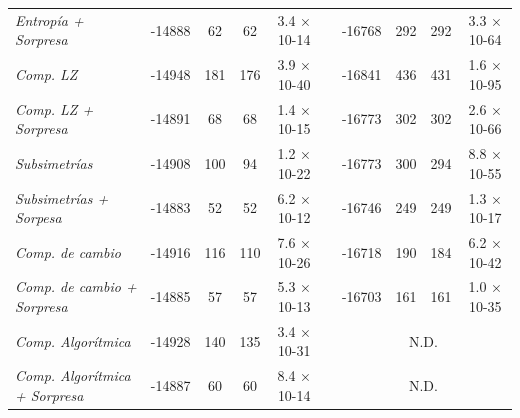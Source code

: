 \begin{table}[]
{\begin{tabular}{lccccccccc}
\textit{Entropía + Sorpresa}          & -14888               & 62                 & 62                & 3.4 × 10-14       &                               & -16768                & 292                 & 292                & 3.3 × 10-64        \\
\textit{Comp. LZ}                     & -14948               & 181                & 176               & 3.9 × 10-40       &                               & -16841                & 436                 & 431                & 1.6 × 10-95        \\
\textit{Comp. LZ + Sorpresa}          & -14891               & 68                 & 68                & 1.4 × 10-15       &                               & -16773                & 302                 & 302                & 2.6 × 10-66        \\
\textit{Subsimetrías}                 & -14908               & 100                & 94                & 1.2 × 10-22       &                               & -16773                & 300                 & 294                & 8.8 × 10-55        \\
\textit{Subsimetrías + Sorpesa}       & -14883               & 52                 & 52                & 6.2 × 10-12       &                               & -16746                & 249                 & 249                & 1.3 × 10-17        \\
\textit{Comp. de cambio}              & -14916               & 116                & 110               & 7.6 × 10-26       &                               & -16718                & 190                 & 184                & 6.2 × 10-42        \\
\textit{Comp. de cambio + Sorpresa}   & -14885               & 57                 & 57                & 5.3 × 10-13       &                               & -16703                & 161                 & 161                & 1.0 × 10-35        \\
\textit{Comp. Algorítmica}            & -14928               & 140                & 135               & 3.4 × 10-31       &                               & \multicolumn{4}{c}{N.D.}                                                              \\
\textit{Comp. Algorítmica + Sorpresa} & -14887               & 60                 & 60                & 8.4 × 10-14       &                               & \multicolumn{4}{c}{N.D.}                                                              \\ \hline
\end{tabular}}


\end{table}
